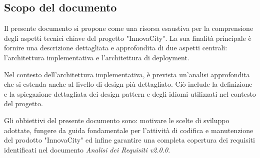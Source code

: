 \subsection{Scopo del documento}
Il presente documento si propone come una risorsa esaustiva per la comprensione degli aspetti tecnici chiave del progetto "InnovaCity". La sua finalità principale è fornire una descrizione dettagliata e approfondita di due aspetti centrali: l'architettura implementativa e l'architettura di deployment.

Nel contesto dell'architettura implementativa, è prevista un'analisi approfondita che si estenda anche al livello di design più dettagliato. Ciò include la definizione e la spiegazione dettagliata dei design pattern e degli idiomi utilizzati nel contesto del progetto.

Gli obbiettivi del presente documento sono: motivare le scelte di sviluppo adottate, fungere da guida fondamentale per l'attività di codifica e manutenzione del prodotto "InnovaCity" ed infine garantire una completa copertura dei requisiti identificati nel documento \textit{Analisi dei Requisiti v2.0.0}.


\begin{comment}
    Questo documento sarà impiegato dal gruppo ByteOps al fine di fornire un'esposizione dell'architettura del prodotto in fase di sviluppo, offrire informazioni per l'estensione del progetto e descrivere le procedure per l'installazione e lo sviluppo in ambiente locale. Nello specifico, la Specifica Tecnica comprende:
\begin{itemize}
    \item  \textbf{L'architettura logica del sistema:} una visione generale della struttura del sistema, identificando i suoi componenti principali e le relazioni tra di essi;
    \item  \textbf{Le tecnologie impiegate:}le tecnologie e le librerie di terze parti utilizzate per la realizzazione del sistema;
    \item  I pattern architetturali adottati e quelli influenzati dalle tecnologie impiegate;
    \item \textbf{Gli idiomi:} pattern di basso livello architetturale, convenzioni o tecniche specifiche utilizzate nel codice sorgente per affrontare determinati problemi o situazioni comuni durante lo sviluppo del software.
\end{itemize}
\end{comment}

